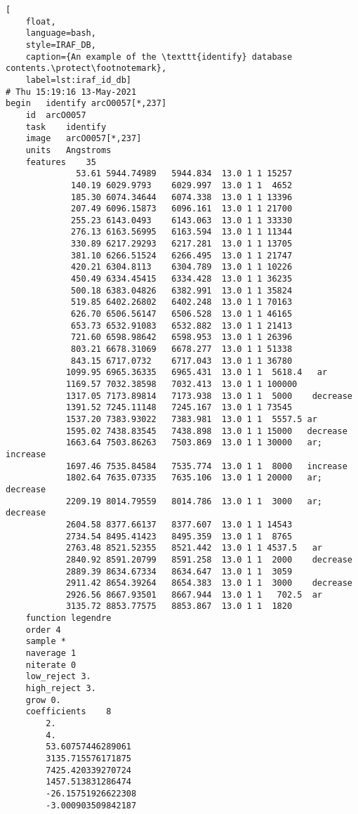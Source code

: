 \begin{lstlisting}[
    float,
    language=bash,
    style=IRAF_DB,
    caption={An example of the \texttt{identify} database contents.\protect\footnotemark},
    label=lst:iraf_id_db]
# Thu 15:19:16 13-May-2021
begin	identify arcO0057[*,237]
    id	arcO0057
    task	identify
    image	arcO0057[*,237]
    units	Angstroms
    features	35
              53.61 5944.74989   5944.834  13.0 1 1 15257
             140.19 6029.9793    6029.997  13.0 1 1  4652
             185.30 6074.34644   6074.338  13.0 1 1 13396
             207.49 6096.15873   6096.161  13.0 1 1 21700
             255.23 6143.0493    6143.063  13.0 1 1 33330
             276.13 6163.56995   6163.594  13.0 1 1 11344
             330.89 6217.29293   6217.281  13.0 1 1 13705
             381.10 6266.51524   6266.495  13.0 1 1 21747
             420.21 6304.8113    6304.789  13.0 1 1 10226
             450.49 6334.45415   6334.428  13.0 1 1 36235
             500.18 6383.04826   6382.991  13.0 1 1 35824
             519.85 6402.26802   6402.248  13.0 1 1 70163
             626.70 6506.56147   6506.528  13.0 1 1 46165
             653.73 6532.91083   6532.882  13.0 1 1 21413
             721.60 6598.98642   6598.953  13.0 1 1 26396
             803.21 6678.31069   6678.277  13.0 1 1 51338
             843.15 6717.0732    6717.043  13.0 1 1 36780
            1099.95 6965.36335   6965.431  13.0 1 1  5618.4   ar
            1169.57 7032.38598   7032.413  13.0 1 1 100000
            1317.05 7173.89814   7173.938  13.0 1 1  5000    decrease
            1391.52 7245.11148   7245.167  13.0 1 1 73545
            1537.20 7383.93022   7383.981  13.0 1 1  5557.5	ar
            1595.02 7438.83545   7438.898  13.0 1 1 15000   decrease
            1663.64 7503.86263   7503.869  13.0 1 1 30000	ar; increase
            1697.46 7535.84584   7535.774  13.0 1 1  8000   increase
            1802.64 7635.07335   7635.106  13.0 1 1 20000	ar; decrease
            2209.19 8014.79559   8014.786  13.0 1 1  3000	ar; decrease
            2604.58 8377.66137   8377.607  13.0 1 1 14543
            2734.54 8495.41423   8495.359  13.0 1 1  8765
            2763.48 8521.52355   8521.442  13.0 1 1 4537.5   ar
            2840.92 8591.20799   8591.258  13.0 1 1  2000    decrease
            2889.39 8634.67334   8634.647  13.0 1 1  3059
            2911.42 8654.39264   8654.383  13.0 1 1  3000    decrease
            2926.56 8667.93501   8667.944  13.0 1 1   702.5  ar
            3135.72 8853.77575   8853.867  13.0 1 1  1820
    function legendre
    order 4
    sample *
    naverage 1
    niterate 0
    low_reject 3.
    high_reject 3.
    grow 0.
    coefficients	8
        2.
        4.
        53.60757446289061
        3135.715576171875
        7425.420339270724
        1457.513831286474
        -26.15751926622308
        -3.000903509842187

\end{lstlisting}

